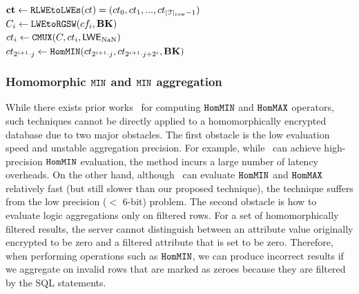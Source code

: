 \begin{algorithm}[t!]
    \caption{$\homminagg$}
    \label{algo: homminagg}
    $\mathbf{ct} \leftarrow \texttt{RLWEtoLWEs}(ct) = (ct_0, ct_1, ...,ct_{|\mathcal{T}|_{\rm row}-1})$ \\
    {
        $C_i \leftarrow \texttt{LWEtoRGSW}(cf_i, {\mathbf{BK}})$ \\
        $ct_i \leftarrow \texttt{CMUX}(C,ct_i,{\mathsf{LWE_{\rm NaN}}})$ \\
    }
    {
        {
            $ct_{2^{i+1}\cdot j} \leftarrow 
            {\texttt{HomMIN}}(ct_{2^{i+1} \cdot j}, ct_{2^{i+1} \cdot j + 2^{i}}, {\mathbf{BK}})$ \\
        }
    }
\end{algorithm}

\subsubsection{Homomorphic $\texttt{MIN}$ and $\texttt{MIN}$ aggregation}
While there exists prior works~\cite{ckkscomparison, pegasus} 
for computing ${\texttt{HomMIN}}$ and ${\texttt{HomMAX}}$ operators, 
such techniques cannot be directly applied to a homomorphically encrypted database
due to two major obstacles.
The first obstacle is the low evaluation speed and unstable aggregation precision.
For example, while~\cite{ckkscomparison} can achieve high-precision ${\texttt{HomMIN}}$ evaluation,
the method incurs a large number of latency overheads. On the other hand,
although~\cite{pegasus} can evaluate ${\texttt{HomMIN}}$ and ${\texttt{HomMAX}}$ relatively fast 
(but still slower than our proposed technique),
the technique suffers from the low precision ($<$ 6-bit) problem.
The second obstacle is how to evaluate logic aggregations
only on filtered rows. For a set of homomorphically filtered
results, the server cannot distinguish between an attribute value originally encrypted
to be zero and a filtered attribute that is set to be zero. Therefore, when performing
operations such as ${\texttt{HomMIN}}$, we can produce incorrect results if we aggregate on invalid rows
that are marked as zeroes because they are filtered by the SQL statements.

